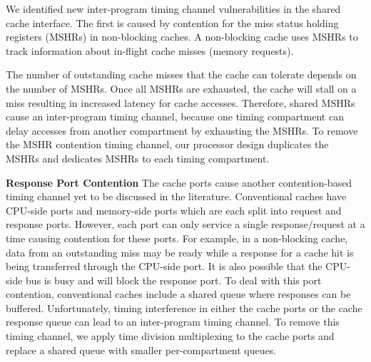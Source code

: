 We identified new inter-program timing channel vulnerabilities in the shared cache 
interface. The first is caused by contention for the miss status holding 
registers (MSHRs) in non-blocking caches.
A non-blocking cache uses MSHRs to track information about in-flight cache 
misses (memory requests).

The number of outstanding cache misses that the cache can tolerate depends on 
the number of MSHRs. Once all MSHRs are exhausted, the cache will stall on
a miss resulting in increased latency for cache accesses.
Therefore, shared MSHRs cause an inter-program timing channel, because one timing
compartment can delay accesses from another compartment by exhausting the 
MSHRs.
To remove the MSHR contention timing channel, our processor design duplicates
the MSHRs and dedicates MSHRs to each timing compartment.

\textbf{Response Port Contention}
The cache ports cause another contention-based timing channel yet to be 
discussed in the literature. Conventional caches have CPU-side ports and 
memory-side ports which are each split into request and response ports. 
However, each port can only service a single response/request at a time
causing contention for these ports. For example, in a non-blocking cache,
data from an outstanding miss may be ready while a response for a cache hit
is being transferred through the CPU-side port.
It is also possible that the CPU-side bus is busy and will block the response
port. 
To deal with this port contention, conventional caches include a shared queue
where responses can be buffered. Unfortunately, timing interference in either 
the cache ports or the cache response queue can
lead to an inter-program timing channel. To remove this timing channel, we apply
time division multiplexing to the cache ports and replace a shared queue with
smaller per-compartment queues.

